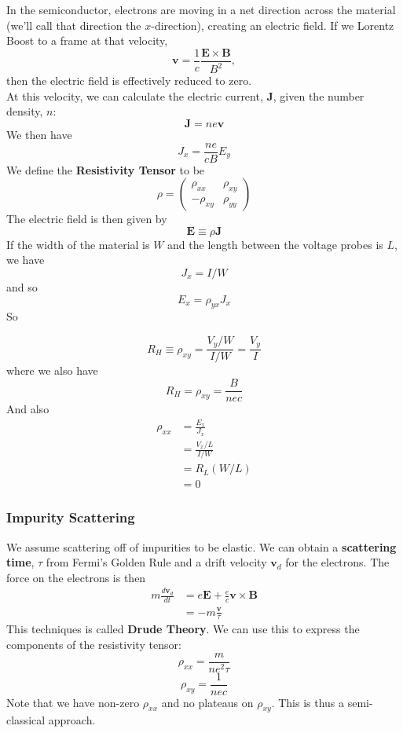 \documentclass{article}
\begin{document}
	In the semiconductor, electrons are moving in a net direction across the material (we'll call that direction the $x$-direction), creating an electric field. If we Lorentz Boost to a frame at that velocity, 
	$$\mathbf{v}=\frac{1}{c}\frac{\mathbf{E}\times\mathbf{B}}{B^2},$$
	then the electric field is effectively reduced to zero. \\
	
	\noindent At this velocity, we can calculate the electric current, $\mathbf{J}$, given the number density, $n$:
	$$\mathbf{J}=ne\mathbf{v}$$
	We then have
	$$J_x=\frac{ne}{cB}E_y$$
	We define the \textbf{Resistivity Tensor} to be
	$$\rho=\begin{pmatrix} \rho_{xx} & \rho_{xy}\\ -\rho_{xy} & \rho_{yy} \end{pmatrix}$$
	The electric field is then given by
	$$\mathbf{E}\equiv \rho \mathbf{J}$$
	If the width of the material is $W$ and the length between the voltage probes is $L$, we have
	$$J_x=I/W$$
	and so $$E_x=\rho_{yx} J_x$$
	So 
	
	$$R_H\equiv \rho_{xy}=\frac{V_y/W}{I/W}=\frac{V_y}{I}$$
	where we also have 
	$$R_H=\rho_{xy}=\frac{B}{nec}$$
	And also
	\begin{align*}
		\rho_{xx}&=\frac{E_x}{J_x}\\
		&=\frac{V_x/L}{I/W}\\
		&=R_L(W/L)\\
		&=0
	\end{align*}	
	\subsubsection{Impurity Scattering}
	We assume scattering off of impurities to be elastic. We can obtain a \textbf{scattering time}, $\tau$ from Fermi's Golden Rule and a drift velocity $\mathbf{v}_d$ for the electrons. The force on the electrons is then
	\begin{align*}
		m\frac{d\mathbf{v}_d}{dt}&=e\mathbf{E}+\frac{e}{c}\mathbf{v}\times \mathbf{B}\\
		&=-m\frac{\mathbf{v}}{\tau}
	\end{align*}
	This techniques is called \textbf{Drude Theory}. We can use this to express the components of the resistivity tensor:
	$$\rho_{xx}=\frac{m}{ne^2\tau}$$
	$$\rho_{xy}=\frac{1}{nec}$$
	Note that we have non-zero $\rho_{xx}$ and no plateaus on $\rho_{xy}$. This is thus a semi-classical approach.	
\end{document}
